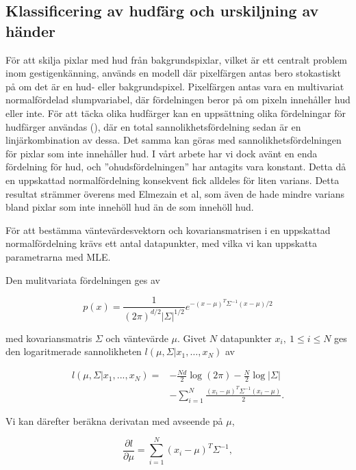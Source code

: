 \documentclass[../rapport_MVEX01-11-05]{subfiles}
\begin{document}
\subsection{Klassificering av hudfärg och urskiljning av händer}

För att skilja pixlar med hud från bakgrundspixlar, vilket är ett
centralt problem inom gestigenkänning, används en modell där pixelfärgen antas
bero stokastiskt på om det är en hud- eller
bakgrundspixel. Pixelfärgen antas vara en multivariat normalfördelad
slumpvariabel, där fördelningen beror på om pixeln innehåller hud
eller inte. För att täcka olika hudfärger kan en uppsättning olika
fördelningar för hudfärger användas (\cite{Elmezain08}), där en total
sannolikhetsfördelning sedan är en linjärkombination av dessa. Det
samma kan göras med sannolikhetsfördelningen för pixlar som inte
innehåller hud. I vårt arbete har vi dock avänt en enda fördelning för
hud, och ''ohudsfördelningen'' har antagits vara konstant. Detta då en
uppskattad normalfördelning konsekvent fick alldeles för liten
varians. Detta resultat strämmer överens med Elmezain et al, som även
de hade mindre varians bland pixlar som inte innehöll hud än de som
innehöll hud.

För att bestämma väntevärdesvektorn och kovariansmatrisen i en
uppskattad normalfördelning krävs ett
antal datapunkter, med vilka vi kan uppskatta parametrarna med MLE.

Den mulitvariata fördelningen ges av

\begin{equation*}
  p(x)=\frac{1}{(2\pi)^{d/2}|\Sigma|^{1/2}}e^{-(x-\mu)^T\Sigma^{-1}(x-\mu)/2}
\end{equation*}

med kovariansmatris $\Sigma$ och väntevärde $\mu$.
Givet $N$ datapunkter $x_i,\:1\leq i\leq N$ ges den logaritmerade
sannolikheten $l(\mu,\Sigma|x_1,{\ldots} ,x_N)$ av

\begin{equation*}
  \begin{aligned}
  l(\mu,\Sigma|x_1,...,x_N) = &-\frac{Nd}{2}\log(2\pi)-\frac{N}{2}\log|\Sigma|\\
                              &-\sum_{i=1}^N\frac{(x_i-\mu)^T\Sigma^{-1}(x_i-\mu)}{2}.
  \end{aligned}
\end{equation*}

Vi kan därefter beräkna derivatan med avseende på $\mu$,

\begin{equation*}
  \frac{\partial l}{\partial \mu}=\sum_{i=1}^N(x_i-\mu)^T\Sigma^{-1},
\end{equation*}
\end{document}
